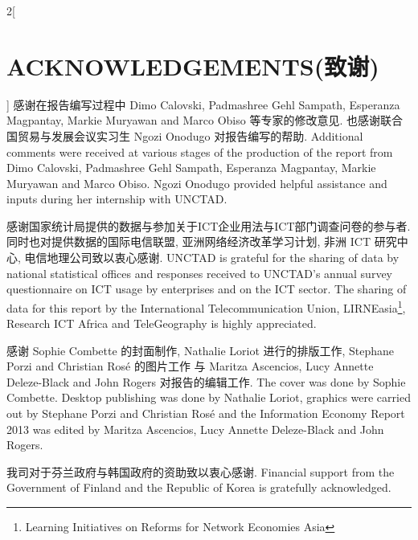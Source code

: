 \documentclass[a4paper, UTF8, 12pt]{article}
\begin{document}
\begin{paracol}{2}[\section{ACKNOWLEDGEMENTS(致谢)}]
    \switchcolumn*
    感谢在报告编写过程中 Dimo Calovski, Padmashree Gehl Sampath, Esperanza Magpantay, Markie Muryawan and Marco Obiso 等专家的修改意见. 也感谢联合国贸易与发展会议实习生 Ngozi Onodugo 对报告编写的帮助.
    \switchcolumn
    Additional comments were received at various stages of the production of the report from Dimo Calovski, Padmashree Gehl Sampath, Esperanza Magpantay, Markie Muryawan and Marco Obiso. Ngozi Onodugo provided helpful assistance and inputs during her internship with UNCTAD. 
   
    \switchcolumn*
    感谢国家统计局提供的数据与参加关于ICT企业用法与ICT部门调查问卷的参与者. 同时也对提供数据的国际电信联盟, 亚洲网络经济改革学习计划, 非洲 ICT 研究中心, 电信地理公司致以衷心感谢.
    \switchcolumn
    UNCTAD is grateful for the sharing of data by national statistical offices and responses received to UNCTAD’s annual survey questionnaire on ICT usage by enterprises and on the ICT sector. The sharing of data for this report by the International Telecommunication Union, LIRNEasia\footnote{Learning Initiatives on Reforms for Network Economies Asia}, Research ICT Africa and TeleGeography is highly appreciated. 
   
    \switchcolumn*
    感谢 Sophie Combette 的封面制作, Nathalie Loriot 进行的排版工作, Stephane Porzi and Christian Rosé 的图片工作 与  Maritza Ascencios, Lucy Annette Deleze-Black and John Rogers 对报告的编辑工作.
    \switchcolumn
    The cover was done by Sophie Combette. Desktop publishing was done by Nathalie Loriot, graphics were carried out by Stephane Porzi and Christian Rosé and the Information Economy Report 2013 was edited by Maritza Ascencios, Lucy Annette Deleze-Black and John Rogers. 
   
    \switchcolumn*
    我司对于芬兰政府与韩国政府的资助致以衷心感谢.
    \switchcolumn
    Financial support from the Government of Finland and the Republic of Korea is gratefully acknowledged. 
\end{paracol}
\end{document}
